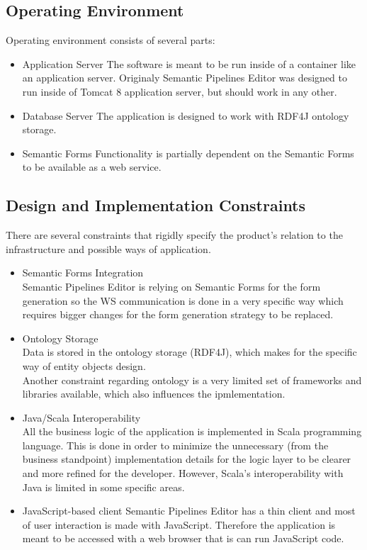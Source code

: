\documentclass{article}
\begin{document}
\subsection{Operating Environment}
Operating environment consists of several parts:
\begin{itemize}
    \item Application Server
	The software is meant to be run inside of a container like an application server. Originaly Semantic Pipelines Editor was designed to run inside of Tomcat 8 application server, but should work in any other.
    \item Database Server
	The application is designed to work with RDF4J ontology storage.
    \item Semantic Forms
	Functionality is partially dependent on the Semantic Forms to be available as a web service.
\end{itemize}
\subsection{Design and Implementation Constraints}
There are several constraints that rigidly specify the product's relation to the infrastructure and possible ways of application.
\begin{itemize}
    \item Semantic Forms Integration\\
	Semantic Pipelines Editor is relying on Semantic Forms for the form generation so the WS communication is done in a very specific way which requires bigger changes for the form generation strategy to be replaced.
    \item Ontology Storage\\
	Data is stored in the ontology storage (RDF4J), which makes for the specific way of entity objects design.\\
	Another constraint regarding ontology is a very limited set of frameworks and libraries available, which also influences the ipmlementation.
    \item Java/Scala Interoperability\\
	All the business logic of the application is implemented in Scala programming language. This is done in order to minimize the unnecessary (from the business standpoint) implementation details for the logic layer to be clearer and more refined for the developer. However, Scala's interoperability with Java is limited in some specific areas.\\
    \item JavaScript-based client
	Semantic Pipelines Editor has a thin client and most of user interaction is made with JavaScript. Therefore the application is meant to be accessed with a web browser that is can run JavaScript code.
\end{itemize}
\end{document}
